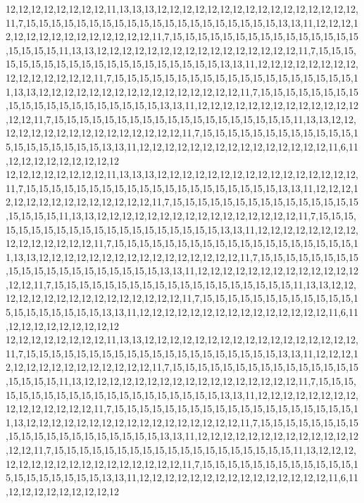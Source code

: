 12,12,12,12,12,12,12,12,11,13,13,13,12,12,12,12,12,12,12,12,12,12,12,12,12,12,12,12,11,7,15,15,15,15,15,15,15,15,15,15,15,15,15,15,15,15,15,15,15,15,13,13,11,12,12,12,12,12,12,12,12,12,12,12,12,12,12,12,11,7,15,15,15,15,15,15,15,15,15,15,15,15,15,15,15,15,15,15,15,11,13,13,12,12,12,12,12,12,12,12,12,12,12,12,12,12,12,12,11,7,15,15,15,15,15,15,15,15,15,15,15,15,15,15,15,15,15,15,15,15,13,13,11,12,12,12,12,12,12,12,12,12,12,12,12,12,12,12,11,7,15,15,15,15,15,15,15,15,15,15,15,15,15,15,15,15,15,15,15,11,13,13,12,12,12,12,12,12,12,12,12,12,12,12,12,12,12,12,11,7,15,15,15,15,15,15,15,15,15,15,15,15,15,15,15,15,15,15,15,15,13,13,11,12,12,12,12,12,12,12,12,12,12,12,12,12,12,12,11,7,15,15,15,15,15,15,15,15,15,15,15,15,15,15,15,15,15,15,15,11,13,13,12,12,12,12,12,12,12,12,12,12,12,12,12,12,12,12,11,7,15,15,15,15,15,15,15,15,15,15,15,15,15,15,15,15,15,15,15,15,13,13,11,12,12,12,12,12,12,12,12,12,12,12,12,12,12,12,11,6,11,12,12,12,12,12,12,12,12,12
12,12,12,12,12,12,12,12,11,13,13,13,12,12,12,12,12,12,12,12,12,12,12,12,12,12,12,12,11,7,15,15,15,15,15,15,15,15,15,15,15,15,15,15,15,15,15,15,15,15,13,13,11,12,12,12,12,12,12,12,12,12,12,12,12,12,12,12,11,7,15,15,15,15,15,15,15,15,15,15,15,15,15,15,15,15,15,15,15,11,13,13,12,12,12,12,12,12,12,12,12,12,12,12,12,12,12,12,11,7,15,15,15,15,15,15,15,15,15,15,15,15,15,15,15,15,15,15,15,15,13,13,11,12,12,12,12,12,12,12,12,12,12,12,12,12,12,12,11,7,15,15,15,15,15,15,15,15,15,15,15,15,15,15,15,15,15,15,15,11,13,13,12,12,12,12,12,12,12,12,12,12,12,12,12,12,12,12,11,7,15,15,15,15,15,15,15,15,15,15,15,15,15,15,15,15,15,15,15,15,13,13,11,12,12,12,12,12,12,12,12,12,12,12,12,12,12,12,11,7,15,15,15,15,15,15,15,15,15,15,15,15,15,15,15,15,15,15,15,11,13,13,12,12,12,12,12,12,12,12,12,12,12,12,12,12,12,12,11,7,15,15,15,15,15,15,15,15,15,15,15,15,15,15,15,15,15,15,15,15,13,13,11,12,12,12,12,12,12,12,12,12,12,12,12,12,12,12,11,6,11,12,12,12,12,12,12,12,12,12
12,12,12,12,12,12,12,12,11,13,13,12,12,12,12,12,12,12,12,12,12,12,12,12,12,12,12,12,11,7,15,15,15,15,15,15,15,15,15,15,15,15,15,15,15,15,15,15,15,15,13,13,11,12,12,12,12,12,12,12,12,12,12,12,12,12,12,12,11,7,15,15,15,15,15,15,15,15,15,15,15,15,15,15,15,15,15,15,15,11,13,12,12,12,12,12,12,12,12,12,12,12,12,12,12,12,12,12,11,7,15,15,15,15,15,15,15,15,15,15,15,15,15,15,15,15,15,15,15,15,13,13,11,12,12,12,12,12,12,12,12,12,12,12,12,12,12,12,11,7,15,15,15,15,15,15,15,15,15,15,15,15,15,15,15,15,15,15,15,11,13,12,12,12,12,12,12,12,12,12,12,12,12,12,12,12,12,12,11,7,15,15,15,15,15,15,15,15,15,15,15,15,15,15,15,15,15,15,15,15,13,13,11,12,12,12,12,12,12,12,12,12,12,12,12,12,12,12,11,7,15,15,15,15,15,15,15,15,15,15,15,15,15,15,15,15,15,15,15,11,13,12,12,12,12,12,12,12,12,12,12,12,12,12,12,12,12,12,11,7,15,15,15,15,15,15,15,15,15,15,15,15,15,15,15,15,15,15,15,15,13,13,11,12,12,12,12,12,12,12,12,12,12,12,12,12,12,12,11,6,11,12,12,12,12,12,12,12,12,12
